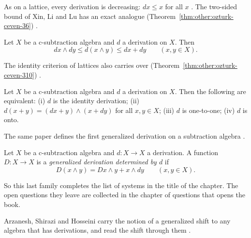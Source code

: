 As on a lattice, every derivation is decreasing: $dx \le x$ for all $x$
\cite[Proposition~3.4, p.~512]{OzturkCeven2009}. The two-sided bound of
Xin, Li and Lu has an exact analogue (Theorem~\ref{thm:other:ozturk-ceven-36})
\cite[Theorem~3.6, p.~512]{OzturkCeven2009}.\begin{theorem}\label{thm:other:ozturk-ceven-36}
Let $X$ be a c-subtraction algebra and $d$ a derivation on $X$. Then
\[
dx \wedge dy \le d(x \wedge y) \le dx + dy
\qquad (x, y \in X).
\]
\end{theorem}

The identity criterion of lattices also carries over (Theorem~\ref{thm:other:ozturk-ceven-310})
\cite[Theorem~3.10, p.~513]{OzturkCeven2009}.\begin{theorem}\label{thm:other:ozturk-ceven-310}
Let $X$ be a c-subtraction algebra and $d$ a derivation on $X$. Then the
following are equivalent: \textup{(i)} $d$ is the identity derivation;
\textup{(ii)} $d(x + y) = (dx + y) \wedge (x + dy)$ for all $x, y \in X$;
\textup{(iii)} $d$ is one-to-one; \textup{(iv)} $d$ is onto.
\end{theorem}

The same paper defines the first generalized derivation on a subtraction
algebra \cite[Definition~3.11, p.~513]{OzturkCeven2009}.

\begin{definition}\label{def:other:subtraction-generalized}
Let $X$ be a c-subtraction algebra and $d \colon X \to X$ a derivation.
A function $D \colon X \to X$ is a \emph{generalized derivation
determined by $d$} if
\[
D(x \wedge y) = Dx \wedge y + x \wedge dy
\qquad (x, y \in X).
\]
\end{definition}

So this last family completes the list of systems in the title of the
chapter. The open questions they leave are collected
in the chapter of questions that opens the book.

Arzanesh, Shirazi and Hosseini carry the notion of a generalized shift to any
algebra that has derivations, and read the shift through them
\cite[Abstract, p.~1]{ArzaneshShiraziHosseini2021}.
